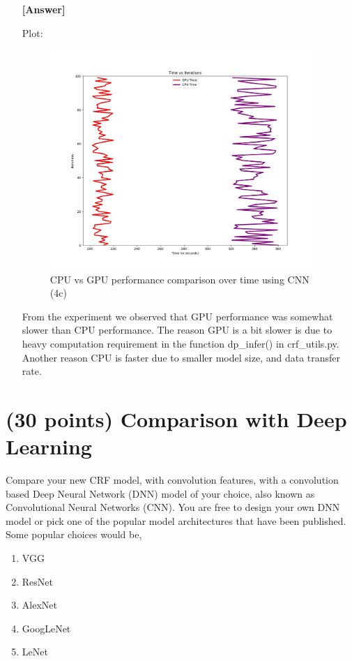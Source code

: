 \documentclass[11pt]{report}
\begin{document}
\begin{itemize}
\item[\textbf{[Answer]} ]{
Plot: 
 \begin{figure}[H]
            	\centering
            	\includegraphics[width=10cm]{latex/cpu.jpeg}
                \caption{CPU vs GPU performance comparison over time using CNN (4c)}
            	\label{fig:compare_optimizer}
            \end{figure}
          
From the experiment we observed that GPU performance was somewhat slower than CPU performance. The reason GPU is a bit slower is due to heavy computation requirement in the function dp\_infer() in crf\_utils.py. Another reason CPU is faster due to smaller model size, and data transfer rate. 
}
 

\end{itemize}

\section{(30 points) Comparison with Deep Learning}
\label{sec:Analysis}

Compare your new CRF model, with convolution features, with a convolution based
Deep Neural Network (DNN) model of your choice, also known as Convolutional
Neural Networks (CNN). You are free to design your own DNN model or pick one of
the popular model architectures that have been published. Some popular choices
would be,

\vspace{-0.5em}
\begin{enumerate}
\item VGG \cite{ZisSimZis14}
\item ResNet \cite{SunHeZhaRenetal15a}
\item AlexNet \cite{HinKriSutHin12a}
\item GoogLeNet \cite{SerSzeLiuJiaetal14}
\item LeNet \cite{LecBotBenHaf98}
\end{enumerate}
\vspace{-0.5em}
\end{document}

